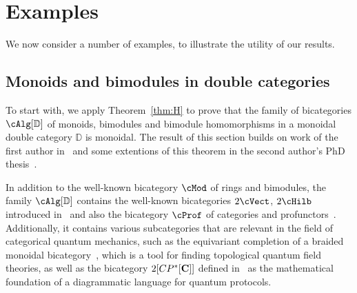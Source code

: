 \section{Examples}\label{sec:Alg} 

We now consider a number of examples, to illustrate the utility of our results.

\subsection{Monoids and bimodules in double categories}
\label{sec:mod}

To start with, we apply Theorem~\ref{thm:H} to prove that the family of bicategories $\cAlg[{\mathbb{D}}]$ of monoids, bimodules and bimodule homomorphisms in a monoidal double category $\mathbb{D}$ is monoidal. The result of this section builds on work of the first author in~\cite[Theorem 11.5]{shulman:frbi} and some extentions of this theorem in the second author's PhD thesis~\cite[Chapter 5]{westerPhDthesis}.

In addition to the well-known bicategory $\cMod$ of rings and bimodules,
the family $\cAlg[{\mathbb{D}}]$ contains the well-known bicategories $2\cVect$, $2\cHilb$ introduced in~\cite{kv:2cat-zam,baez2004higher} and also the bicategory $\cProf$ of categories and profunctors~\cite{benabou}. Additionally, it contains various subcategories that are relevant in the field of categorical quantum mechanics, such as the equivariant completion of a braided monoidal bicategory~\cite{carquevillerunkel}, which is a tool for finding topological quantum field theories, as well as the bicategory $2[CP^*[{\bf C}]]$ defined in~\cite{heunenvicarywester} as the mathematical foundation of a diagrammatic language for quantum protocols. %

